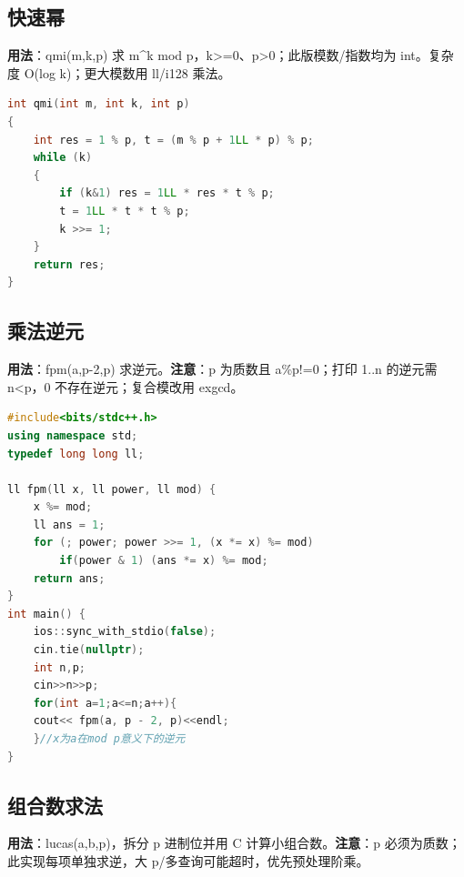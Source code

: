 \documentclass[a4paper,9pt]{extarticle}
\begin{document}
\subsection{快速幂}

\textbf{用法}：qmi(m,k,p) 求 m\textasciicircum{}k mod p，k>\allowbreak{}=\allowbreak{}0、p>\allowbreak{}0；此版模数/指数均为 int。复杂度 O(log k)；更大模数用 ll/\allowbreak{}i128 乘法。

\begin{lstlisting}[language={C++}]
int qmi(int m, int k, int p)
{
    int res = 1 % p, t = (m % p + 1LL * p) % p;
    while (k)
    {
        if (k&1) res = 1LL * res * t % p;
        t = 1LL * t * t % p;
        k >>= 1;
    }
    return res;
}
\end{lstlisting}

\subsection{乘法逆元}

\textbf{用法}：fpm(\allowbreak{}a,\allowbreak{}p-\allowbreak{}2,\allowbreak{}p) 求逆元。\textbf{注意}：p 为质数且 a\%p!=0；打印 1..n 的逆元需 n<p，0 不存在逆元；复合模改用 exgcd。

\begin{lstlisting}[language={C++}]
#include<bits/stdc++.h>
using namespace std;
typedef long long ll;

ll fpm(ll x, ll power, ll mod) {
    x %= mod;
    ll ans = 1;
    for (; power; power >>= 1, (x *= x) %= mod)
    	if(power & 1) (ans *= x) %= mod;
    return ans;
}
int main() {
    ios::sync_with_stdio(false);
    cin.tie(nullptr);
    int n,p;
    cin>>n>>p;
    for(int a=1;a<=n;a++){
	cout<< fpm(a, p - 2, p)<<endl;
    }//x为a在mod p意义下的逆元
}
\end{lstlisting}

\subsection{组合数求法}

\textbf{用法}：lucas(\allowbreak{}a,\allowbreak{}b,\allowbreak{}p)，拆分 p 进制位并用 C 计算小组合数。\textbf{注意}：p 必须为质数；此实现每项单独求逆，大 p/多查询可能超时，优先预处理阶乘。
\end{document}

